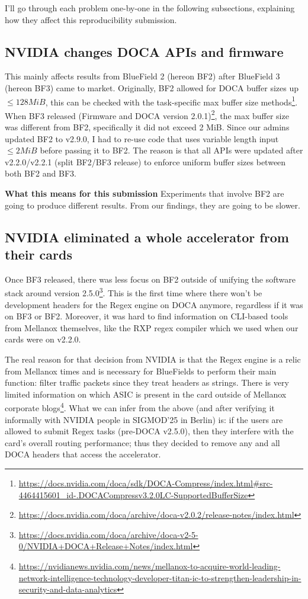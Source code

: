 \documentclass[sigconf, nonacm]{acmart}
\begin{document}
I'll go through each problem one-by-one in the following subsections,
explaining how they affect this reproducibility submission.

\subsection{NVIDIA changes DOCA APIs and firmware}
This mainly affects results from BlueField 2 (hereon BF2) after BlueField 3 (hereon BF3)
came to market.
Originally, BF2 allowed for DOCA buffer sizes up $\leq128 MiB$, this can be checked
with the task-specific max buffer size methods\footnote{\url{https://docs.nvidia.com/doca/sdk/DOCA-Compress/index.html\#src-4464415601_id-.DOCACompressv3.2.0LC-SupportedBufferSize}}.
When BF3 released (Firmware and DOCA version 2.0.1)\footnote{\url{https://docs.nvidia.com/doca/archive/doca-v2.0.2/release-notes/index.html}},
the max buffer size was different from BF2, specifically it did not exceed 2 MiB.
Since our admins updated BF2 to v2.9.0, I had to re-use
code that uses variable length input  $\leq2 MiB$ before passing it to BF2. 
The reason is that all APIs were updated after v2.2.0/v2.2.1 (split BF2/BF3 release) 
to enforce uniform buffer sizes between both BF2 and BF3.

\textbf{What this means for this submission}
Experiments that involve BF2 are going to produce different results.
From our findings, they are going to be slower.

\subsection{NVIDIA eliminated a whole accelerator from their cards}
Once BF3 released, there was less focus on BF2 outside of unifying the software stack
around version 2.5.0\footnote{\url{https://docs.nvidia.com/doca/archive/doca-v2-5-0/NVIDIA+DOCA+Release+Notes/index.html}}.
This is the first time where there won't be development headers for the
Regex engine on DOCA anymore, regardless if it was on BF3 or BF2.
Moreover, it was hard to find information on CLI-based tools from Mellanox
themselves, like the RXP regex compiler which we used when our cards were on v2.2.0.

The real reason for that decision from NVIDIA is that the Regex engine is a relic from
Mellanox times and is necessary for BlueFields to perform their main function:
filter traffic packets since they treat headers as strings. 
There is very limited information on which ASIC is present
in the card outside of Mellanox corporate blogs\footnote{\url{https://nvidianews.nvidia.com/news/mellanox-to-acquire-world-leading-network-intelligence-technology-developer-titan-ic-to-strengthen-leadership-in-security-and-data-analytics}}.
What we can infer from the above (and after verifying it informally with
NVIDIA people in SIGMOD'25 in Berlin) is: if the users
are allowed to submit Regex tasks (pre-DOCA v2.5.0), then they
interfere with the card's overall routing performance; thus they decided
to remove any and all DOCA headers that access the accelerator.
\end{document}
